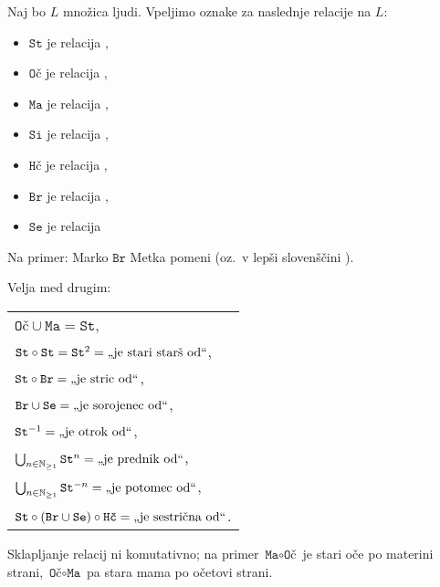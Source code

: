 		\begin{zgled}
			Naj bo $L$ množica ljudi. Vpeljimo oznake za naslednje relacije na $L$:
			\begin{itemize}
				\item
					$\texttt{St}$ je relacija ,
				\item
					$\texttt{Oč}$ je relacija ,
				\item
					$\texttt{Ma}$ je relacija ,
				\item
					$\texttt{Si}$ je relacija ,
				\item
					$\texttt{Hč}$ je relacija ,
				\item
					$\texttt{Br}$ je relacija ,
				\item
					$\texttt{Se}$ je relacija 
			\end{itemize}
			
			Na primer: Marko $\texttt{Br}$ Metka pomeni  (oz.~v lepši slovenščini ).
			
			Velja med drugim:
			
			\begin{tabular}{l}
				$\texttt{Oč} \cup \texttt{Ma} = \texttt{St}$, \\
				$\texttt{St} \circ \texttt{St} = \texttt{St}^2 = \text{\qt{je stari starš od}}$, \\
				$\texttt{St} \circ \texttt{Br} = \text{\qt{je stric od}}$, \\
				$\texttt{Br} \cup \texttt{Se} = \text{\qt{je sorojenec od}}$, \\
				$\texttt{St}^{-1} = \text{\qt{je otrok od}}$, \\
				$\bigcup_{n \in \NN_{\geq 1}} \texttt{St}^n = \text{\qt{je prednik od}}$, \\
				$\bigcup_{n \in \NN_{\geq 1}} \texttt{St}^{-n} = \text{\qt{je potomec od}}$, \\
				$\texttt{St} \circ (\texttt{Br} \cup \texttt{Se}) \circ \texttt{Hč} = \text{\qt{je sestrična od}}$.
			\end{tabular}
			
			Sklapljanje relacij ni komutativno; na primer $\texttt{Ma} \circ \texttt{Oč}$ je stari oče po materini strani, $\texttt{Oč} \circ \texttt{Ma}$ pa stara mama po očetovi strani.
			
		\end{zgled}
	
